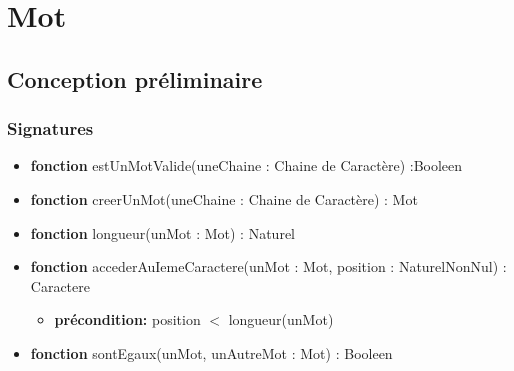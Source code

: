 \documentclass{article}
\begin{document}
    \pagestyle{empty}
    \noindent

    \section*{Mot}
    \subsection*{Conception préliminaire}
    
    \subsubsection*{Signatures}

	\begin{itemize}[label=$\ $, leftmargin=1cm]
		 \item \textbf{fonction} estUnMotValide(uneChaine : Chaine de Caractère) :Booleen
		 \item \textbf{fonction} creerUnMot(uneChaine : Chaine de Caractère) : Mot
		 \item \textbf{fonction} longueur(unMot : Mot) : Naturel
		 \item \textbf{fonction} accederAuIemeCaractere(unMot : Mot, position : NaturelNonNul) : Caractere
		 \begin{itemize}[label=$| $]
            \item \textbf{précondition:} position $<$ longueur(unMot)
         \end{itemize}
         \item \textbf{fonction} sontEgaux(unMot, unAutreMot : Mot) : Booleen
	\end{itemize} 
    
\end{document}
